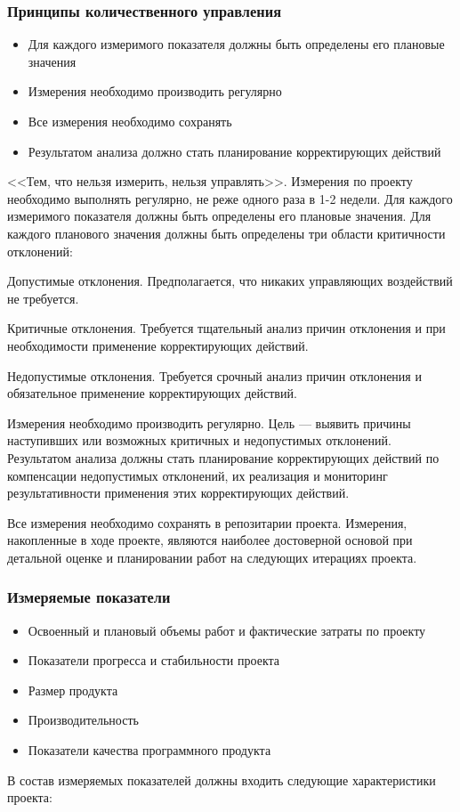 \documentclass{../industrial-development}
\begin{document}
    \begin{frame} \frametitle{Принципы количественного управления}
        \begin{itemize}
            \item Для каждого измеримого показателя должны быть определены его плановые значения
            \item Измерения необходимо производить регулярно
            \item Все измерения необходимо сохранять
            \item Результатом анализа должно стать планирование корректирующих действий
        \end{itemize}
    \end{frame}
    \lecturenotes
<<Тем, что нельзя измерить, нельзя управлять>>. Измерения по проекту необходимо выполнять регулярно, не реже одного раза в 1-2 недели. Для каждого измеримого показателя должны быть определены его плановые значения. Для каждого планового значения должны быть определены три области критичности отклонений:

Допустимые отклонения. Предполагается, что никаких управляющих воздействий не требуется.

Критичные отклонения. Требуется тщательный анализ причин отклонения и при необходимости применение корректирующих действий.

Недопустимые отклонения. Требуется срочный анализ причин отклонения и обязательное применение корректирующих действий.

Измерения необходимо производить регулярно. Цель — выявить причины наступивших или возможных критичных и недопустимых отклонений. Результатом анализа должны стать планирование корректирующих действий по компенсации недопустимых отклонений, их реализация и мониторинг результативности применения этих корректирующих действий.

Все измерения необходимо сохранять в репозитарии проекта. Измерения, накопленные в ходе проекте, являются наиболее достоверной основой при детальной оценке и планировании работ на следующих итерациях проекта.

    \begin{frame} \frametitle{Измеряемые показатели}
        \begin{itemize}
            \item Освоенный и плановый объемы работ и фактические затраты по проекту
            \item Показатели прогресса и стабильности проекта
            \item Размер продукта
            \item Производительность
            \item Показатели качества программного продукта
        \end{itemize}
    \end{frame}
    \lecturenotes   
    В состав измеряемых показателей должны входить следующие характеристики проекта:
\end{document}
